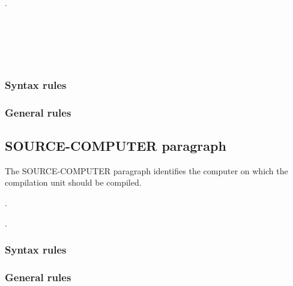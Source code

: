 
\begin{syntax}[\miscextcolour]
  \begin{0-1}
     .
  \end{0-1}
  \newline
  \begin{0+}
     \\
     \\
     \\
     \\
  \end{0+}
\end{syntax}

\subsubsection{Syntax rules}

\subsubsection{General rules}

\subsection{SOURCE-COMPUTER paragraph}

The SOURCE-COMPUTER paragraph identifies the computer on which the compilation unit should be compiled.

\begin{syntax}
  .
  \begin{0-1}
    \begin{1=}
      \computername
    \end{1=}\gnucobol{\ldots}
    .
  \end{0-1}
\end{syntax}

\subsubsection{Syntax rules}

\subsubsection{General rules}

